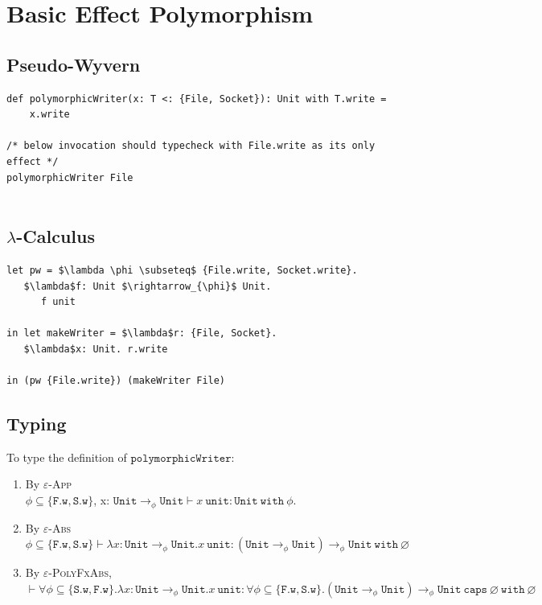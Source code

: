 \documentclass{llncs}
\newcommand{\keywadj}[1]{\mathtt{#1}}
\newcommand{\keyw}[1]{\keywadj{#1}~}
\newcommand{\kw}[1]{\keyw{ #1 }}
\newcommand{\kwa}[1]{\keywadj{ #1 }}
\newcommand{\unit}[0]{ \kwa{unit} }
\newcommand{\Unit}[0]{ \kwa{Unit} }
\newcommand{\polycap}[3]{
	\forall #1. #2~ \kw{caps} #3
}
\begin{document}
\section{Basic Effect Polymorphism}

\subsection*{Pseudo-Wyvern}
\begin{lstlisting}
def polymorphicWriter(x: T <: {File, Socket}): Unit with T.write =
    x.write
 
/* below invocation should typecheck with File.write as its only effect */
polymorphicWriter File
    
\end{lstlisting}

\subsection*{$\lambda$-Calculus}
\begin{lstlisting}
let pw = $\lambda \phi \subseteq$ {File.write, Socket.write}.
   $\lambda$f: Unit $\rightarrow_{\phi}$ Unit.
      f unit

in let makeWriter = $\lambda$r: {File, Socket}.
   $\lambda$x: Unit. r.write

in (pw {File.write}) (makeWriter File)
\end{lstlisting}


\subsection*{Typing}

To type the definition of $\kwa{polymorphicWriter}$:
\begin{enumerate}
	\item By \textsc{$\varepsilon$-App}\\ $\phi \subseteq \{ \kwa{F.w, S.w} \}$, x: $\Unit \rightarrow_{\phi} \Unit \vdash x~\unit: \Unit~\kw{with} \phi$.
	\item By \textsc{$\varepsilon$-Abs}\\ $\phi \subseteq \{ \kwa{F.w, S.w} \} \vdash \lambda x: \Unit \rightarrow_{\phi} \Unit. x~\unit: (\Unit \rightarrow_{\phi} \Unit) \rightarrow_{\phi} \Unit~\kw{with} \varnothing$
	\item By \textsc{$\varepsilon$-PolyFxAbs}, \\ $\vdash \forall \phi \subseteq \{ \kwa{S.w, F.w} \}. \lambda x: \Unit \rightarrow_{\phi} \Unit. x~\unit:\polycap{\phi \subseteq \{ \kwa{F.w, S.w} \}}{(\Unit \rightarrow_{\phi} \Unit) \rightarrow_{\phi} \Unit}{\varnothing}~\kw{with} \varnothing$
\end{enumerate}
\end{document}
